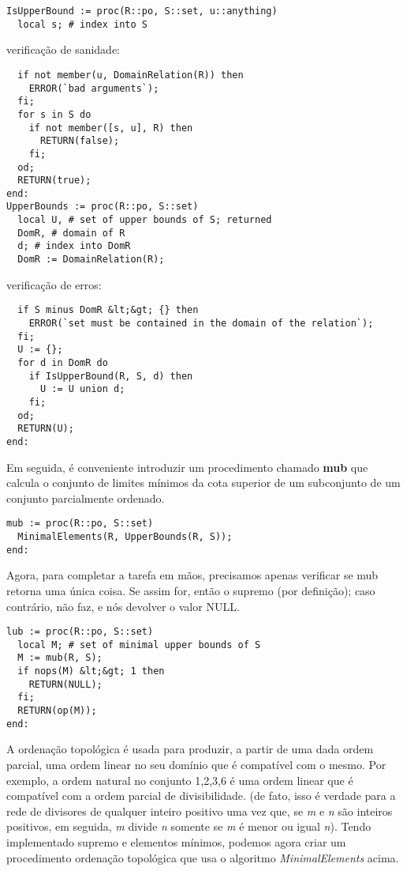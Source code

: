 \documentclass[a4paper]{article}
\begin{document}
\begin{lstlisting}
IsUpperBound := proc(R::po, S::set, u::anything)
  local s; # index into S
\end{lstlisting}
verificação de sanidade:
\begin{lstlisting}
  if not member(u, DomainRelation(R)) then
    ERROR(`bad arguments`);
  fi;
  for s in S do
    if not member([s, u], R) then
      RETURN(false);
    fi;
  od;
  RETURN(true);
end:
UpperBounds := proc(R::po, S::set)
  local U, # set of upper bounds of S; returned
  DomR, # domain of R
  d; # index into DomR
  DomR := DomainRelation(R);
\end{lstlisting}
verificação de erros:
\begin{lstlisting}
  if S minus DomR &lt;&gt; {} then
    ERROR(`set must be contained in the domain of the relation`);
  fi;
  U := {};
  for d in DomR do
    if IsUpperBound(R, S, d) then
      U := U union d;
    fi;
  od;
  RETURN(U);
end:
\end{lstlisting}

Em seguida, é conveniente introduzir um procedimento chamado \textbf{mub} que calcula o conjunto de limites mínimos da cota superior de um subconjunto de um conjunto parcialmente ordenado.

\begin{lstlisting}
mub := proc(R::po, S::set)
  MinimalElements(R, UpperBounds(R, S));
end:
\end{lstlisting}

Agora, para completar a tarefa em mãos, precisamos apenas verificar se mub retorna uma única coisa. Se assim for, então o supremo (por definição); caso contrário, não faz, e nós devolver o valor NULL.

\begin{lstlisting}
lub := proc(R::po, S::set)
  local M; # set of minimal upper bounds of S
  M := mub(R, S);
  if nops(M) &lt;&gt; 1 then
    RETURN(NULL);
  fi;
  RETURN(op(M));
end:
\end{lstlisting}

A ordenação topológica é usada para produzir, a partir de uma dada ordem parcial, uma ordem linear no seu domínio que é compatível com o mesmo. Por exemplo, a ordem natural no conjunto {1,2,3,6} é uma ordem linear que é compatível com a ordem parcial de divisibilidade. (de fato, isso é verdade para a rede de divisores de qualquer inteiro positivo uma vez que, se \textit{m} e \textit{n} são inteiros positivos, em seguida, \textit{m} divide \textit{n} somente se \textit{m} é menor ou igual \textit{n}). Tendo implementado supremo e elementos mínimos, podemos agora criar um procedimento ordenação topológica que usa o algoritmo \textit{MinimalElements} acima.
\end{document}
